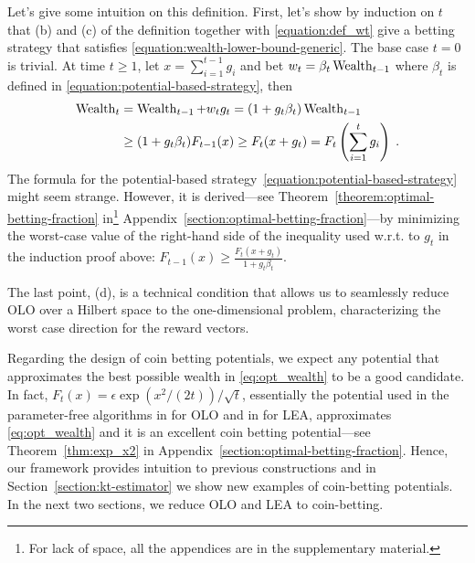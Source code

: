 Let's give some intuition on this definition.  First, let's show by induction
on $t$ that (b) and (c) of the definition together with \eqref{equation:def_wt} give a betting strategy that satisfies
\eqref{equation:wealth-lower-bound-generic}. The base case $t=0$ is trivial. At
time $t \ge 1$, let $x = \sum_{i=1}^{t-1} g_i$ and bet $w_t=\beta_t \operatorname{Wealth}_{t-1}$
where $\beta_t$ is defined in \eqref{equation:potential-based-strategy}, then
\begin{align*}
\operatorname{Wealth}_t
&= \operatorname{Wealth}_{t-1} + w_t g_t
= (1+g_t \beta_t) \operatorname{Wealth}_{t-1} \\
&\ge (1 + g_t \beta_t) F_{t-1}(x)
\ge F_t(x + g_t)
= F_t \left( \sum_{i=1}^t g_i \right) \; .
\end{align*}
%
The formula for the potential-based
strategy~\eqref{equation:potential-based-strategy} might seem strange. However,
it is derived---see Theorem~\ref{theorem:optimal-betting-fraction}
in\footnote{For lack of space, all the appendices are in the supplementary
material.} Appendix~\ref{section:optimal-betting-fraction}---by minimizing the
worst-case value of the right-hand side of the inequality used w.r.t. to $g_t$
in the induction proof above: $F_{t-1}(x) \ge \tfrac{F_{t}(x +
g_t)}{1+g_t\beta_t}$.

The last point, (d), is a technical condition that allows us to seamlessly
reduce OLO over a Hilbert space to the one-dimensional problem, characterizing
the worst case direction for the reward vectors.

Regarding the design of coin betting potentials, we expect any potential that
approximates the best possible wealth in \eqref{eq:opt_wealth} to be a good
candidate.  In fact, $F_t(x)=\epsilon \exp \left(x^2/(2t)\right)/\sqrt{t}$,
essentially the potential used in the parameter-free algorithms in
\cite{McMahan-Orabona-2014, Orabona-2014} for \ac{OLO} and in
\cite{Chaudhuri-Freund-Hsu-2009, Luo-Schapire-2014, Luo-Schapire-2015} for
\ac{LEA}, approximates \eqref{eq:opt_wealth} and it is an excellent coin
betting potential---see Theorem~\ref{thm:exp_x2} in
Appendix~\ref{section:optimal-betting-fraction}. Hence, our framework provides
intuition to previous constructions and in Section~\ref{section:kt-estimator}
we show new examples of coin-betting potentials. In the next two sections, we
reduce \ac{OLO} and \ac{LEA} to coin-betting.
